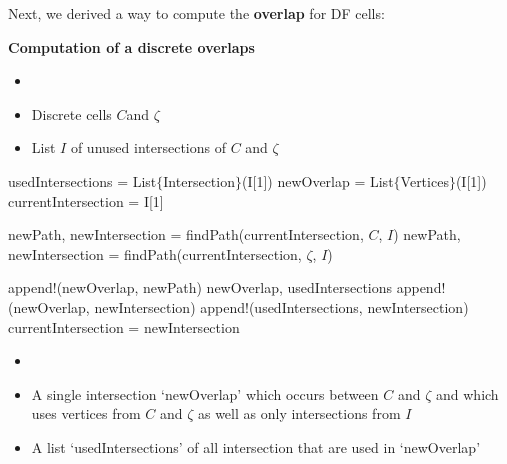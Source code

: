 \newpage
Next, we derived a way to compute the \textbf{overlap} for DF cells: 
\begin{algorithm} \textbf{Computation of a discrete overlaps} \label{alge:discreteOverlap}
	\begin{itemize} 
		\itemsep0em 
		\item[] 
		\item Discrete cells  $C$and $\zeta$
		\item List $I$ of unused intersections of $C$ and $\zeta$ 
	\end{itemize}
	\begin{algorithmic}
			\State usedIntersections = List$\{$Intersection$\}$(I[1])
			\State newOverlap = List$\{$Vertices$\}$(I[1])
			\State currentIntersection = I[1]
			
			
					\State newPath, newIntersection = findPath(currentIntersection, $C$, $I$)
				\Else
					\State newPath, newIntersection = findPath(currentIntersection, $\zeta$, $I$)
				\EndIf
				
				\State append!(newOverlap, newPath)
					\State \Return newOverlap, usedIntersections
				\Else
					\State append!(newOverlap, newIntersection)
					\State append!(usedIntersections, newIntersection) 
					\State currentIntersection = newIntersection
				\EndIf
			\EndFor
		\EndFunction
	\end{algorithmic}
	\begin{itemize} 
		\itemsep0em 
		\item[] 
		\item A single intersection `newOverlap' which occurs between $C$ and $\zeta$ and which uses vertices from  $C$ and $\zeta$ as well as only intersections from $I$
		\item A list `usedIntersections' of all intersection that are used in `newOverlap'
	\end{itemize}	
\end{algorithm}


